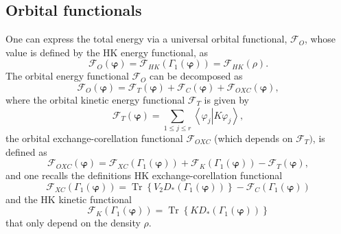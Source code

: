 \documentclass[aps,preprint]{revtex4}%
\begin{document}
\subsection{Orbital functionals\label{GSOFunc}}

One can express the total energy via a universal orbital functional,
$\mathcal{F}_{O}$, whose value is defined by the HK energy functional, as
\begin{equation}
\mathcal{F}_{O}\left(  \boldsymbol{\varphi}\right)  =\mathcal{F}_{HK}\left(
\Gamma_{1}\left(  \boldsymbol{\varphi}\right)  \right)  =\mathcal{F}%
_{HK}\left(  \rho\right)  . \label{FO}%
\end{equation}
The orbital energy functional $\mathcal{F}_{O}$ can be decomposed as
\begin{equation}
\mathcal{F}_{O}\left(  \boldsymbol{\varphi}\right)  =\mathcal{F}_{T}\left(
\boldsymbol{\varphi}\right)  +\mathcal{F}_{C}\left(  \boldsymbol{\varphi
}\right)  +\mathcal{F}_{OXC}\left(  \boldsymbol{\varphi}\right)  , \label{KS1}%
\end{equation}
where the orbital kinetic energy functional $\mathcal{F}_{T}$ is given by
\begin{equation}
\mathcal{F}_{T}\left(  \boldsymbol{\varphi}\right)  =\sum_{1\leq j\leq
r}\left\langle \varphi_{j}\left\vert K\varphi_{j}\right.  \right\rangle ,
\end{equation}
the orbital exchange-corellation functional $\mathcal{F}_{OXC}$ (which depends
on $\mathcal{F}_{T}\boldsymbol{)}$, is defined as
\begin{equation}
\mathcal{F}_{OXC}\left(  \boldsymbol{\varphi}\right)  =\mathcal{F}_{XC}\left(
\Gamma_{1}\left(  \boldsymbol{\varphi}\right)  \right)  +\mathcal{F}%
_{K}\left(  \Gamma_{1}\left(  \boldsymbol{\varphi}\right)  \right)
-\mathcal{F}_{T}\left(  \boldsymbol{\varphi}\right)  , \label{KS2}%
\end{equation}
and one recalls the definitions HK exchange-corellation functional
\begin{equation}
\mathcal{F}_{XC}\left(  \Gamma_{1}\left(  \boldsymbol{\varphi}\right)
\right)  =\operatorname{Tr}\left\{  V_{2}D_{\ast}\left(  \Gamma_{1}\left(
\boldsymbol{\varphi}\right)  \right)  \right\}  -\mathcal{F}_{C}\left(
\Gamma_{1}\left(  \boldsymbol{\varphi}\right)  \right)  \label{KS3}%
\end{equation}
and the HK kinetic functional
\begin{equation}
\mathcal{F}_{K}\left(  \Gamma_{1}\left(  \boldsymbol{\varphi}\right)  \right)
=\operatorname{Tr}\left\{  KD_{\ast}\left(  \Gamma_{1}\left(
\boldsymbol{\varphi}\right)  \right)  \right\}  \label{KS4}%
\end{equation}
that only depend on the density $\rho$.
\end{document}
